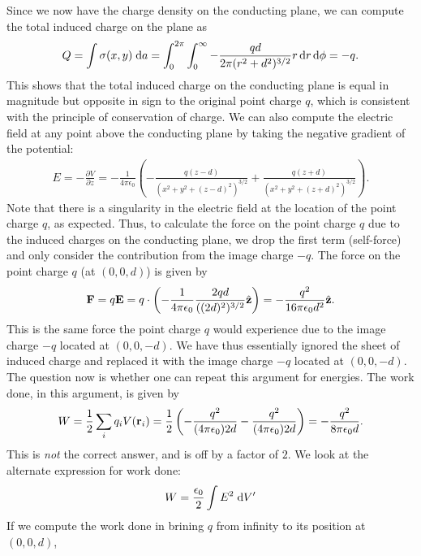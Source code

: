 Since we now have the charge density on the conducting plane, we can compute the total induced charge on the plane as
\begin{align}
    Q = \int \sigma(x,y) \; \mathrm{d}a = \int_{0}^{2\pi} \int_{0}^{\infty} -\frac{q d}{2 \pi (r^{2} + d^{2})^{3/2}} r \, \mathrm{d}r \, \mathrm{d}\phi = -q.
\end{align}
This shows that the total induced charge on the conducting plane is equal in magnitude but opposite in sign to the original point charge $q$, which is consistent with the principle of conservation of charge. We can also compute the electric field at any point above the conducting plane by taking the negative gradient of the potential:
\begin{align}
    E = -\frac{\partial V}{\partial z} = -\frac{1}{4\pi \epsilon_{0}} \left( -\frac{q(z-d)}{(x^{2}+y^{2}+(z-d)^{2})^{3/2}} + \frac{q(z+d)}{(x^{2}+y^{2}+(z+d)^{2})^{3/2}} \right).
\end{align}
Note that there is a singularity in the electric field at the location of the point charge $q$, as expected. Thus, to calculate the force on the point charge $q$ due to the induced charges on the conducting plane, we drop the first term (self-force) and only consider the contribution from the image charge $-q$. The force on the point charge $q$ (at $(0,0,d)$) is given by
\begin{align}
    \mathbf{F} = q\mathbf{E} = q \cdot \left( -\frac{1}{4\pi\epsilon_{0}} \frac{2qd}{((2d)^{2})^{3/2}} \hat{\mathbf{z}}\right) = -\frac{q^{2}}{16 \pi \epsilon_{0} d^{2}} \hat{\mathbf{z}}.
\end{align}
This is the same force the point charge $q$ would experience due to the image charge $-q$ located at $(0,0,-d)$. We have thus essentially ignored the sheet of induced charge and replaced it with the image charge $-q$ located at $(0,0,-d)$. The question now is whether one can repeat this argument for energies. The work done, in this argument, is given by
\begin{align}
    W = \frac{1}{2} \sum_{i} q_{i} V(\mathbf{r}_{i}) = \frac{1}{2} \left( -\frac{q^{2}}{(4\pi \epsilon_{0}) 2d} - \frac{q^{2}}{(4\pi\epsilon_{0})2d} \right) = -\frac{q^{2}}{8 \pi \epsilon_{0} d}.
\end{align}
This is \textit{not} the correct answer, and is off by a factor of $2$. We look at the alternate expression for work done:
\begin{align}
    W = \frac{\epsilon_{0}}{2} \int E^{2} \; \mathrm{d}V'
\end{align}
If we compute the work done in brining $q$ from infinity to its position at $(0,0,d)$,

